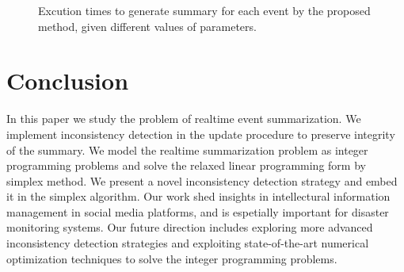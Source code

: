 \documentclass[envcountsame]{llncs}
\begin{document}
\begin{figure}
  \centering
{}
\hspace{-6ex}
\caption{Excution times to generate summary for each event by the proposed method, given different values of parameters.}
\end{figure}

\section{Conclusion}\label{sec:conclusion}
 In this paper we study the problem of realtime event summarization. We implement inconsistency detection in the update procedure to preserve integrity of the summary. We model the realtime summarization problem as integer programming problems and solve the relaxed linear programming form by simplex method. We present a novel inconsistency detection strategy and embed it in the simplex algorithm. Our work shed insights in intellectural information management in social media platforms, and is espetially important for disaster monitoring systems. Our future direction includes exploring more advanced inconsistency detection strategies and exploiting state-of-the-art numerical optimization techniques to solve the integer programming problems. 
\end{document}
